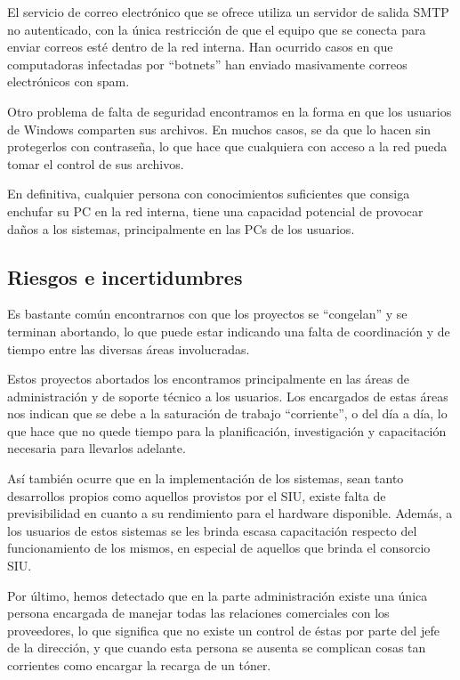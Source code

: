 \documentclass[a4paper,11pt,oneside]{article}
\begin{document}
El servicio de correo electrónico que se ofrece utiliza un servidor de
salida SMTP no autenticado, con la única restricción de que el equipo
que se conecta para enviar correos esté dentro de la red interna. Han
ocurrido casos en que computadoras infectadas por ``botnets'' han
enviado masivamente correos electrónicos con spam.

Otro problema de falta de seguridad encontramos en la forma en que los usuarios
de Windows comparten sus archivos. En muchos casos, se da que lo hacen sin
protegerlos con contraseña, lo que hace que cualquiera con acceso a la red
pueda tomar el control de sus archivos.

En definitiva, cualquier persona con conocimientos suficientes que consiga
enchufar su PC en la red interna, tiene una capacidad potencial de provocar
daños a los sistemas, principalmente en las PCs de los usuarios.
%
\subsection*{Riesgos e incertidumbres}
%
Es bastante común encontrarnos con que los proyectos se ``congelan'' y
se terminan abortando, lo que puede estar indicando una falta de
coordinación y de tiempo entre las diversas áreas involucradas.

Estos proyectos abortados los encontramos principalmente en las áreas
de administración y de soporte técnico a los usuarios. Los encargados
de estas áreas nos indican que se debe a la saturación de trabajo
``corriente'', o del día a día, lo que hace que no quede tiempo para
la planificación, investigación y capacitación necesaria para
llevarlos adelante.

Así también ocurre que en la implementación de los sistemas, sean
tanto desarrollos propios como aquellos provistos por el SIU, existe
falta de previsibilidad en cuanto a su rendimiento para el hardware
disponible. Además, a los usuarios de estos sistemas se les brinda
escasa capacitación respecto del funcionamiento de los mismos, en
especial de aquellos que brinda el consorcio SIU.

Por último, hemos detectado que en la parte administración existe una
única persona encargada de manejar todas las relaciones comerciales
con los proveedores, lo que significa que no existe un control de
éstas por parte del jefe de la dirección, y que cuando esta persona se
ausenta se complican cosas tan corrientes como encargar la recarga de
un tóner.
\end{document}
